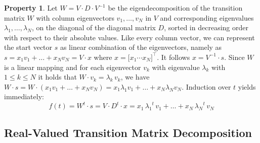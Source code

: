 \documentclass[preprint,12pt,times,authoryear]{elsarticle}%
\theoremstyle{definition}
\newtheorem{prop}{Property}
\begin{document}
\begin{prop}\label{eigen}
Let $W = V \cdot D \cdot V^{-1}$ be the eigendecomposition of the transition matrix $W$ with column
eigenvectors $v_1,\dots,v_N$ in $V$ and corresponding eigenvalues $\lambda_1, \dots, \lambda_N$,
on the diagonal of the diagonal matrix $D$, sorted in decreasing order with
respect to their absolute values. Like every column vector, we can represent the
start vector $s$ as linear combination of the eigenvectors, namely as $s =
x_1 v_1 + \dots + x_N v_N = V \cdot x$ where $x = \big[ x_1 \cdots x_N
\big]^\top$. It follows $x = V^{-1} \cdot s$.
Since $W$ is a linear mapping and for each eigenvector $v_k$ with eigenvalue
$\lambda_k$ with $1 \le k \le N$ it holds that $W \cdot v_k = \lambda_k\, v_k$, we
have $W \cdot s = W \cdot (x_1 v_1 + \dots + x_N v_N) = x_1 \lambda_1 v_1 +
\dots + x_N \lambda_N v_N$. Induction over $t$ yields immediately:
\begin{equation}\label{form}
	f(t) = W^t \cdot s = V \cdot D^t \cdot x =
	x_1\,{\lambda_1}^t\,v_1 + \dots + x_N\,{\lambda_N}^t\,v_N
\end{equation}
\end{prop}

\subsection{Real-Valued Transition Matrix Decomposition}\label{real}
\end{document}

